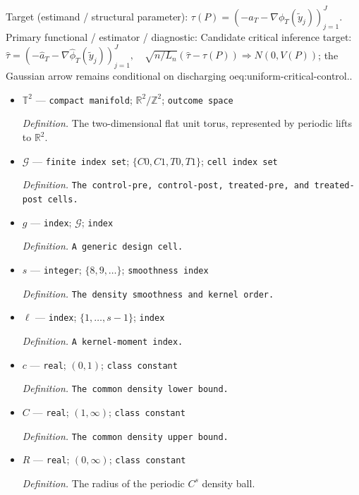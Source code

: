 \documentclass{article}
\begin{document}
Target (estimand / structural parameter): \(\tau(P)=(-a_T-\nabla\phi_T(\widetilde y_j))_{j=1}^J\).
Primary functional / estimator / diagnostic: Candidate critical inference target: \(\widehat\tau=(-\widehat a_T-\nabla\widehat\phi_T(\widetilde y_j))_{j=1}^J,\quad\sqrt{n/L_n}(\widehat\tau-\tau(P))\Rightarrow N(0,V(P))\); the Gaussian arrow remains conditional on discharging oeq:uniform-critical-control..
\begin{itemize}
  \item \(\mathbb T^2\) --- \texttt{compact manifold}; \(\mathbb R^2/\mathbb Z^2\); \texttt{outcome space}
  \par\smallskip\noindent\emph{Definition.} The two-dimensional flat unit torus, represented by periodic lifts to \(\mathbb R^2\).
  \item \(\mathcal G\) --- \texttt{finite index set}; \(\{C0,C1,T0,T1\}\); \texttt{cell index set}
  \par\smallskip\noindent\emph{Definition.} \texttt{The control-\allowbreak{}pre,\allowbreak{} control-\allowbreak{}post,\allowbreak{} treated-\allowbreak{}pre,\allowbreak{} and treated-\allowbreak{}post cells.}
  \item \(g\) --- \texttt{index}; \(\mathcal G\); \texttt{index}
  \par\smallskip\noindent\emph{Definition.} \texttt{A generic design cell.}
  \item \(s\) --- \texttt{integer}; \(\{8,9,\ldots\}\); \texttt{smoothness index}
  \par\smallskip\noindent\emph{Definition.} \texttt{The density smoothness and kernel order.}
  \item \(\ell\) --- \texttt{index}; \(\{1,\ldots,s-1\}\); \texttt{index}
  \par\smallskip\noindent\emph{Definition.} \texttt{A kernel-\allowbreak{}moment index.}
  \item \(c\) --- \texttt{real}; \((0,1)\); \texttt{class constant}
  \par\smallskip\noindent\emph{Definition.} \texttt{The common density lower bound.}
  \item \(C\) --- \texttt{real}; \((1,\infty)\); \texttt{class constant}
  \par\smallskip\noindent\emph{Definition.} \texttt{The common density upper bound.}
  \item \(R\) --- \texttt{real}; \((0,\infty)\); \texttt{class constant}
  \par\smallskip\noindent\emph{Definition.} The radius of the periodic \(C^s\) density ball.

\end{itemize}
\end{document}
